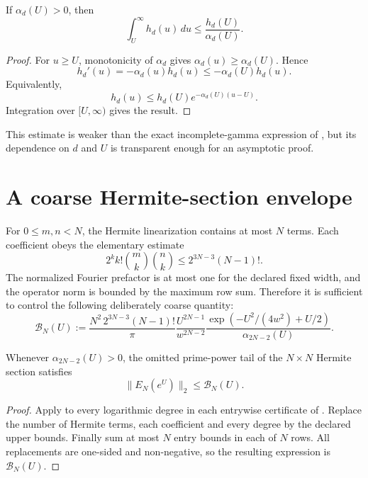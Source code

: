 \begin{lemma}
\label{lem:adaptive-elementary-tail}
If $\alpha_d(U)>0$, then
\[
 \int_U^\infty h_d(u)\,du
 \le
 \frac{h_d(U)}{\alpha_d(U)}.
\]
\end{lemma}

\begin{proof}
For $u\ge U$, monotonicity of $\alpha_d$ gives
$\alpha_d(u)\ge\alpha_d(U)$. Hence
\[
 h_d'(u)=-\alpha_d(u)h_d(u)
 \le -\alpha_d(U)h_d(u).
\]
Equivalently,
\[
 h_d(u)
 \le
 h_d(U)e^{-\alpha_d(U)(u-U)}.
\]
Integration over $[U,\infty)$ gives the result.
\end{proof}

This estimate is weaker than the exact incomplete-gamma expression of
, but its dependence on $d$ and $U$ is
transparent enough for an asymptotic proof.

\section{A coarse Hermite-section envelope}

For $0\le m,n<N$, the Hermite linearization contains at most $N$ terms. Each
coefficient obeys the elementary estimate
\[
 2^k k!\binom{m}{k}\binom{n}{k}
 \le
 2^{3N-3}(N-1)!.
\]
The normalized Fourier prefactor is at most one for the declared fixed width,
and the operator norm is bounded by the maximum row sum. Therefore it is
sufficient to control the following deliberately coarse quantity:
\[
 \mathcal B_N(U)
 :=
 \frac{N^2\,2^{3N-3}(N-1)!}{\pi}
 \frac{U^{2N-1}}{w^{2N-2}}
 \frac{
 \exp\!\left(-U^2/(4w^2)+U/2\right)
 }{
 \alpha_{2N-2}(U)
 }.
\]

\begin{proposition}
\label{prop:adaptive-coarse-envelope}
Whenever $\alpha_{2N-2}(U)>0$, the omitted prime-power tail of the
$N\times N$ Hermite section satisfies
\[
 \|E_N(e^U)\|_2\le\mathcal B_N(U).
\]
\end{proposition}

\begin{proof}
Apply  to every logarithmic degree in each
entrywise certificate of . Replace the number
of Hermite terms, each coefficient and every degree by the declared upper
bounds. Finally sum at most $N$ entry bounds in each of $N$ rows. All
replacements are one-sided and non-negative, so the resulting expression is
$\mathcal B_N(U)$.
\end{proof}

